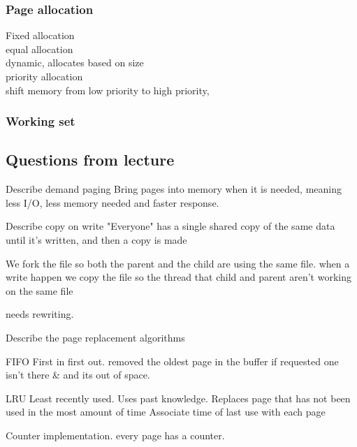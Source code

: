 \documentclass[a4paper,10pt,titlepage]{report}
\begin{document}
\subsubsection{Page allocation}

\hspace{10mm} Fixed allocation \\

\hspace{15mm} equal allocation \\
\hspace{20mm} dynamic, allocates based on size \\

\hspace{10mm} priority allocation \\

\hspace{15mm} shift memory from low priority to high priority, \\

\subsubsection{Working set}



\subsection{Questions from lecture}

Describe demand paging
Bring pages into memory when it is needed, meaning less I/O, less memory needed and faster response.

Describe copy on write
"Everyone" has a single shared copy of the same data until it's written, and then a copy is made

We fork the file so both the parent and the child are using the same file. when a write happen we copy the file so the thread that child and parent aren't working on the same file

needs rewriting.

Describe the page replacement algorithms

FIFO
First in first out. removed the oldest page in the buffer if requested one isn't there \& and its out of space.


LRU
Least recently used.
Uses past knowledge.
Replaces page that has not been used in the most amount of time 
Associate time of last use with each page

Counter implementation.
    every page has a counter. 
\end{document}

